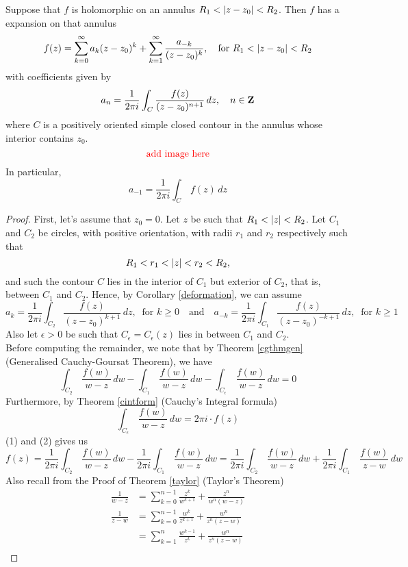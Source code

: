 \begin{theorem}\label{laurent}
Suppose that $f$ is holomorphic on an annulus $R_1 < \left\lvert z - z_0\right\rvert < R_2$. Then $f$ has a  expansion on that annulus
\[f(z) = \sum_{k=0}^\infty a_k(z - z_0)^k + \sum_{k=1}^\infty\frac{a_{-k}}{(z - z_0)^k},\quad \text{for }R_1 < \left\lvert z - z_0\right\rvert < R_2\]
with coefficients given by
\[a_n = \frac{1}{2\pi i}\int_C \frac{f(z)}{(z - z_0)^{n+1}}\,dz,\quad n \in \mathbf Z\]
where $C$ is a positively oriented simple closed contour in the annulus whose interior contains $z_0$. 
\[\text{\color{red}add image here}\]
In particular, 
\[a_{-1} = \frac{1}{2\pi i}\int_C\, f(z)\,dz\]
\end{theorem}
\begin{proof}
First, let's assume that $z_0 = 0$. Let $z$ be such that $R_1 < \left\lvert z\right\rvert < R_2$. Let $C_1$ and $C_2$ be circles, with positive orientation, with radii $r_1$ and $r_2$ respectively such that
\[R_1 < r_1 < \left\lvert z\right\rvert < r_2 < R_2,\]
and such the contour $C$ lies in the interior of $C_1$ but exterior of $C_2$, that is, between $C_1$ and $C_2$. Hence, by Corollary \ref{deformation}, we can assume
\[a_k = \frac{1}{2\pi i}\int_{C_2} \frac{f(z)}{(z - z_0)^{k+1}}\,dz,\ \text{ for }k\geq 0 \quad \text{and} \quad a_{-k} = \frac{1}{2\pi i}\int_{C_1} \frac{f(z)}{(z - z_0)^{-k+1}}\,dz,\ \text{ for }k\geq 1\]
Also let $\epsilon > 0$ be such that $C_\epsilon = C_\epsilon(z)$ lies in between $C_1$ and $C_2$.\\[0.5em]
Before computing the remainder, we note that by Theorem \ref{cgthmgen} (Generalised Cauchy-Goursat Theorem), we have
\[\int_{C_2}\,\frac{f(w)}{w - z}\,dw - \int_{C_1}\,\frac{f(w)}{w - z}\,dw - \int_{C_\epsilon}\,\frac{f(w)}{w - z}\,dw = 0 \tag{$1$}\]
Furthermore, by Theorem \ref{cintform} (Cauchy's Integral formula)
\[\int_{C_\epsilon}\,\frac{f(w)}{w - z}\,dw = 2\pi i\cdot f(z) \tag{$2$}\]
(1) and (2) gives us
\[f(z) = \frac{1}{2\pi i}\int_{C_2}\,\frac{f(w)}{w - z}\,dw - \frac{1}{2\pi i} \int_{C_1}\,\frac{f(w)}{w - z}\,dw = \frac{1}{2\pi i}\int_{C_2}\,\frac{f(w)}{w - z}\,dw + \frac{1}{2\pi i} \int_{C_1}\,\frac{f(w)}{z - w}\,dw\]
Also recall from the Proof of Theorem \ref{taylor} (Taylor's Theorem)
\begin{align*}
\frac{1}{w - z} &= \sum_{k=0}^{n-1}\frac{z^k}{w^{k+1}} + \frac{z^n}{w^n(w - z)}\\[1em]
\frac{1}{z - w} &= \sum_{k=0}^{n-1}\frac{w^k}{z^{k+1}} + \frac{w^n}{z^n(z - w)}\\[0.5em]
 &= \sum_{k=1}^{n}\frac{w^{k-1}}{z^k} + \frac{w^n}{z^n(z - w)}\\[0.5em]

\end{align*}
\end{proof}
